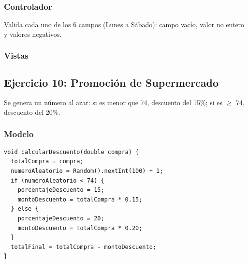 \documentclass{article}
\begin{document}
\subsubsection{Controlador}
Valida cada uno de los 6 campos (Lunes a Sábado): campo vacío, valor no entero y valores negativos.

\subsubsection{Vistas}
\begin{figure}[H]
\centering
\begin{minipage}{0.45\textwidth}\centering
\end{minipage}\hfill
\begin{minipage}{0.45\textwidth}\centering
\end{minipage}
\end{figure}

\subsection{Ejercicio 10: Promoción de Supermercado}
Se genera un número al azar: si es menor que 74, descuento del 15\%; si es $\geq$ 74, descuento del 20\%.

\subsubsection{Modelo}
\begin{tcolorbox}[title=PromocionSupermercadoModel]
\begin{lstlisting}
void calcularDescuento(double compra) {
  totalCompra = compra;
  numeroAleatorio = Random().nextInt(100) + 1;
  if (numeroAleatorio < 74) {
    porcentajeDescuento = 15;
    montoDescuento = totalCompra * 0.15;
  } else {
    porcentajeDescuento = 20;
    montoDescuento = totalCompra * 0.20;
  }
  totalFinal = totalCompra - montoDescuento;
}
\end{lstlisting}
\end{tcolorbox}
\end{document}
